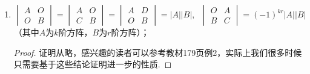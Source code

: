 \begin{enumerate}
    \item $\begin{vmatrix}
                  A & O \\ O & B
              \end{vmatrix} = \begin{vmatrix}
                  A & O \\ C & B
              \end{vmatrix} = \begin{vmatrix}
                  A & D \\ O & B
              \end{vmatrix} = |A||B|,\enspace\begin{vmatrix}
                  O & A \\ B & C
              \end{vmatrix} = (-1)^{kr}|A||B|$（其中$A$为$k$阶方阵，$B$为$r$阶方阵）；
          \begin{proof}
              证明从略，感兴趣的读者可以参考教材179页例2，实际上我们很多时候只需要基于这些结论证明进一步的性质.
          \end{proof}


\end{enumerate}
